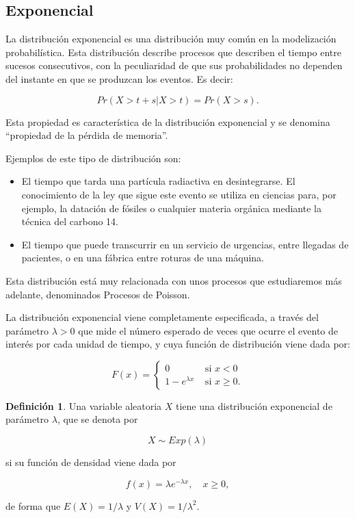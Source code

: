 \documentclass[
]{book}
\newenvironment{yellowbox}{
  \definecolor{shadecolor}{rgb}{210, 180, 140}  
  \color{black}
  \begin{shaded}}
 {\end{shaded}}
\theoremstyle{definition}
\newtheorem{definition}{Definición}[chapter]
\theoremstyle{definition}
\theoremstyle{definition}
\theoremstyle{definition}
\theoremstyle{remark}
\begin{document}
\hypertarget{exponencial}{%
\subsection{Exponencial}\label{exponencial}}

La distribución exponencial es una distribución muy común en la modelización probabilística. Esta distribución describe procesos que describen el tiempo entre sucesos consecutivos, con la peculiaridad de que sus probabilidades no dependen del instante en que se produzcan los eventos. Es decir:

\[Pr(X > t+s | X > t) = Pr(X > s).\]

Esta propiedad es característica de la distribución exponencial y se denomina ``propiedad de la pérdida de memoria''.

Ejemplos de este tipo de distribución son:

\begin{itemize}
\item
  El tiempo que tarda una partícula radiactiva en desintegrarse. El conocimiento de la ley que sigue este evento se utiliza en ciencias para, por ejemplo, la datación de fósiles o cualquier materia orgánica mediante la técnica del carbono 14.
\item
  El tiempo que puede transcurrir en un servicio de urgencias, entre llegadas de pacientes, o en una fábrica entre roturas de una máquina.
\end{itemize}

Esta distribución está muy relacionada con unos procesos que estudiaremos más adelante, denominados Procesos de Poisson.

La distribución exponencial viene completamente especificada, a través del parámetro \(\lambda >0\) que mide el número esperado de veces que ocurre el evento de interés por cada unidad de tiempo, y cuya función de distribución viene dada por:

\begin{equation}
F(x) = 
\begin{cases}
0 & \text{ si } x < 0 \\
1 - e^{\lambda x} & \text{ si } x \geq 0.
\end{cases}
\label{eq:var-exponencial2}
\end{equation}

\begin{yellowbox}

\begin{definition}
\protect\hypertarget{def:vexponencial}{}\label{def:vexponencial}Una variable aleatoria \(X\) tiene una distribución exponencial de parámetro \(\lambda\), que se denota por

\[X \sim Exp(\lambda)\]

si su función de densidad viene dada por

\begin{equation}
f(x)=\lambda e^{-\lambda x}, \quad x \geq 0,
\end{equation}

de forma que \(E(X) = 1/\lambda\) y \(V(X) = 1/\lambda^2.\)
\end{definition}

\end{yellowbox}
\end{document}
